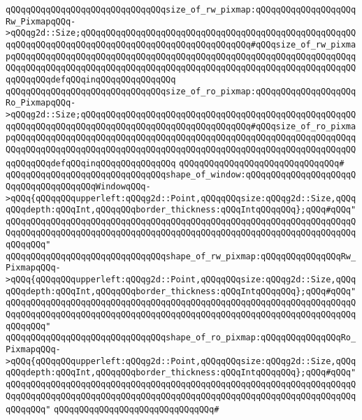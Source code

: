 \verb|qQQqqQQqqQQqqQQqqQQqqQQqqQQqqQQqsize_of_rw_pixmap:qQQqqQQqqQQqqQQqqQQqRw_PixmapqQQq->qQQqg2d::Size;qQQqqQQqqQQqqQQqqQQqqQQqqQQqqQQqqQQqqQQqqQQqqQQqqQQqqQQqqQQqqQQqqQQqqQQqqQQqqQQqqQQqqQQqqQQqqQQqqQQqqQQq#qQQqsize_of_rw_pixmapqQQqqQQqqQQqqQQqqQQqqQQqqQQqqQQqqQQqqQQqqQQqqQQqqQQqqQQqqQQqqQQqqQQqqQQqqQQqqQQqqQQqqQQqqQQqqQQqqQQqqQQqqQQqqQQqqQQqqQQqqQQqqQQqqQQqqQQqqQQqqQQqqQQqdefqQQqinqQQqqQQqqQQqqQQq|\newline
\verb|qQQqqQQqqQQqqQQqqQQqqQQqqQQqqQQqsize_of_ro_pixmap:qQQqqQQqqQQqqQQqqQQqRo_PixmapqQQq->qQQqg2d::Size;qQQqqQQqqQQqqQQqqQQqqQQqqQQqqQQqqQQqqQQqqQQqqQQqqQQqqQQqqQQqqQQqqQQqqQQqqQQqqQQqqQQqqQQqqQQqqQQqqQQqqQQq#qQQqsize_of_ro_pixmapqQQqqQQqqQQqqQQqqQQqqQQqqQQqqQQqqQQqqQQqqQQqqQQqqQQqqQQqqQQqqQQqqQQqqQQqqQQqqQQqqQQqqQQqqQQqqQQqqQQqqQQqqQQqqQQqqQQqqQQqqQQqqQQqqQQqqQQqqQQqqQQqqQQqdefqQQqinqQQqqQQqqQQqqQQq|\newline
\verb|qQQqqQQqqQQqqQQqqQQqqQQqqQQqqQQq#|\newline
\verb|qQQqqQQqqQQqqQQqqQQqqQQqqQQqqQQqshape_of_window:qQQqqQQqqQQqqQQqqQQqqQQqqQQqqQQqqQQqqQQqWindowqQQq->qQQq{qQQqqQQqupperleft:qQQqg2d::Point,qQQqqQQqsize:qQQqg2d::Size,qQQqqQQqdepth:qQQqInt,qQQqqQQqborder_thickness:qQQqIntqQQqqQQq};qQQq#qQQq"qQQqqQQqqQQqqQQqqQQqqQQqqQQqqQQqqQQqqQQqqQQqqQQqqQQqqQQqqQQqqQQqqQQqqQQqqQQqqQQqqQQqqQQqqQQqqQQqqQQqqQQqqQQqqQQqqQQqqQQqqQQqqQQqqQQqqQQqqQQqqQQqqQQq"|\newline
\verb|qQQqqQQqqQQqqQQqqQQqqQQqqQQqqQQqshape_of_rw_pixmap:qQQqqQQqqQQqqQQqRw_PixmapqQQq->qQQq{qQQqqQQqupperleft:qQQqg2d::Point,qQQqqQQqsize:qQQqg2d::Size,qQQqqQQqdepth:qQQqInt,qQQqqQQqborder_thickness:qQQqIntqQQqqQQq};qQQq#qQQq"qQQqqQQqqQQqqQQqqQQqqQQqqQQqqQQqqQQqqQQqqQQqqQQqqQQqqQQqqQQqqQQqqQQqqQQqqQQqqQQqqQQqqQQqqQQqqQQqqQQqqQQqqQQqqQQqqQQqqQQqqQQqqQQqqQQqqQQqqQQqqQQqqQQq"|\newline
\verb|qQQqqQQqqQQqqQQqqQQqqQQqqQQqqQQqshape_of_ro_pixmap:qQQqqQQqqQQqqQQqRo_PixmapqQQq->qQQq{qQQqqQQqupperleft:qQQqg2d::Point,qQQqqQQqsize:qQQqg2d::Size,qQQqqQQqdepth:qQQqInt,qQQqqQQqborder_thickness:qQQqIntqQQqqQQq};qQQq#qQQq"qQQqqQQqqQQqqQQqqQQqqQQqqQQqqQQqqQQqqQQqqQQqqQQqqQQqqQQqqQQqqQQqqQQqqQQqqQQqqQQqqQQqqQQqqQQqqQQqqQQqqQQqqQQqqQQqqQQqqQQqqQQqqQQqqQQqqQQqqQQqqQQqqQQq"|\newline
\verb|qQQqqQQqqQQqqQQqqQQqqQQqqQQqqQQq#|\newline
